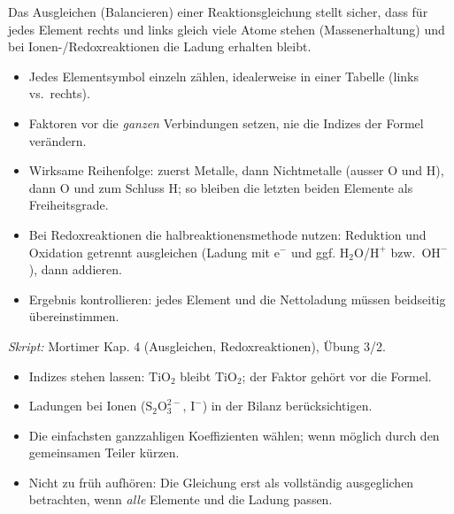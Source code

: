 

Das Ausgleichen (Balancieren) einer Reaktionsgleichung stellt sicher, dass für
jedes Element rechts und links gleich viele Atome stehen (Massenerhaltung) und
bei Ionen-/Redoxreaktionen die Ladung erhalten bleibt.

\begin{werkzeugkasten}
\begin{itemize}
  \item Jedes Elementsymbol einzeln zählen, idealerweise in einer Tabelle
        (links vs.\ rechts).
  \item Faktoren vor die \emph{ganzen} Verbindungen setzen, nie die Indizes
        der Formel verändern.
  \item Wirksame Reihenfolge: zuerst Metalle, dann Nichtmetalle (ausser
        $\mathrm{O}$ und $\mathrm{H}$), dann $\mathrm{O}$ und zum Schluss
        $\mathrm{H}$; so bleiben die letzten beiden Elemente als Freiheitsgrade.
  \item Bei Redoxreaktionen die halbreaktionensmethode nutzen: Reduktion und
        Oxidation getrennt ausgleichen (Ladung mit $\mathrm{e^-}$ und ggf.
        $\mathrm{H_2O}$/$\mathrm{H^+}$ bzw.\ $\mathrm{OH^-}$), dann addieren.
  \item Ergebnis kontrollieren: jedes Element und die Nettoladung müssen
        beidseitig übereinstimmen.
\end{itemize}
\textit{Skript:} Mortimer Kap. 4 (Ausgleichen, Redoxreaktionen), Übung 3/2.
\end{werkzeugkasten}

\begin{achtung}
\begin{itemize}
  \item Indizes stehen lassen: $\mathrm{TiO_2}$ bleibt $\mathrm{TiO_2}$; der
        Faktor gehört vor die Formel.
  \item Ladungen bei Ionen ($\mathrm{S_2O_3^{2-}}$, $\mathrm{I^-}$) in der
        Bilanz berücksichtigen.
  \item Die einfachsten ganzzahligen Koeffizienten wählen; wenn möglich durch
        den gemeinsamen Teiler kürzen.
  \item Nicht zu früh aufhören: Die Gleichung erst als vollständig ausgeglichen
        betrachten, wenn \emph{alle} Elemente und die Ladung passen.
\end{itemize}
\end{achtung}
